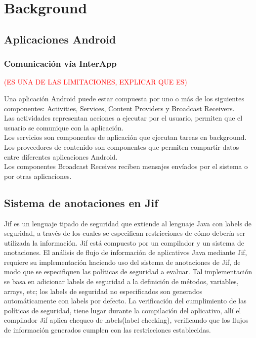 \section{Background}
\label{sec:back}

\subsection{Aplicaciones Android}

\subsubsection{Comunicación vía InterApp}
\textcolor{red}{(ES UNA DE LAS LIMITACIONES, EXPLICAR QUE ES)}

Una aplicación Android puede estar compuesta por uno o más de los siguientes
componentes: Activities, Services, Content Providers y Broadcast Receivers.\\
Las actividades representan acciones a ejecutar por el usuario, permiten que el
usuario se comunique con la aplicación.\\
Los servicios son componentes de aplicación que ejecutan tareas en background.\\
Los proveedores de contenido son componentes que permiten compartir datos entre
diferentes aplicaciones Android.\\
Los componentes Broadcast Receives reciben mensajes envíados por el sistema o
por otras aplicaciones.

\subsection{Sistema de anotaciones en Jif}
Jif es un lenguaje tipado de seguridad que extiende al lenguaje Java con labels
de seguridad, a través de los cuales se especifican restricciones de cómo
debería ser utilizada la información. Jif está compuesto por un compilador y un
sistema de anotaciones.\newline
El análisis de flujo de información de aplicativos Java mediante Jif, requiere
su implementación haciendo uso del sistema de anotaciones de Jif, de modo que se
especifiquen las políticas de seguridad a evaluar.
Tal implementación se basa en adicionar labels de seguridad a la definición
de métodos, variables, arrays, etc; los labels de seguridad no especificados son
generados automáticamente con labels por defecto.\newline
La verificación del cumplimiento de las políticas de seguridad, tiene lugar
durante la compilación del aplicativo, allí el compilador Jif aplica chequeo de
labels(label checking)\cite{jifRef},  verificando que los flujos de información
generados cumplen con las restricciones establecidas. 

